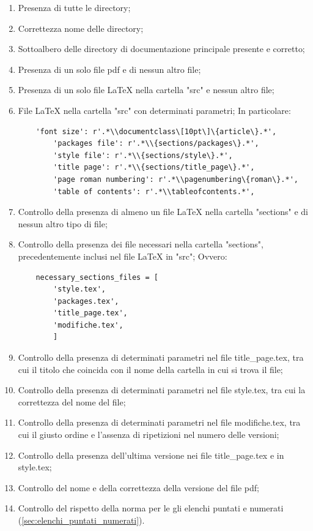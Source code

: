 \begin{enumerate}
	\item Presenza di tutte le directory;
	\item Correttezza nome delle directory;
	\item Sottoalbero delle directory di documentazione principale presente e corretto;
	\item Presenza di un solo file pdf e di nessun altro file;
	\item Presenza di un solo file LaTeX nella cartella "src" e nessun altro file;
	\item File LaTeX nella cartella "src" con determinati parametri;
	\newline In particolare:
	\begin{lstlisting}
	'font size': r'.*\\documentclass\[10pt\]\{article\}.*',
        'packages file': r'.*\\{sections/packages\}.*',
        'style file': r'.*\\{sections/style\}.*',
        'title page': r'.*\\{sections/title_page\}.*',
        'page roman numbering': r'.*\\pagenumbering\{roman\}.*',
        'table of contents': r'.*\\tableofcontents.*',
	\end{lstlisting}
	\item Controllo della presenza di almeno un file LaTeX nella cartella "sections" e di nessun altro tipo di file;
	\item Controllo della presenza dei file necessari nella cartella "sections", precedentemente inclusi nel file LaTeX in "src";
	Ovvero:
	\begin{lstlisting}
	necessary_sections_files = [
        'style.tex',
        'packages.tex',
        'title_page.tex',
        'modifiche.tex',
    	]
	\end{lstlisting}
	\item Controllo della presenza di determinati parametri nel file title\_page.tex, tra cui il titolo che coincida con il nome della cartella in cui si trova il file;
	\item Controllo della presenza di determinati parametri nel file style.tex, tra cui la correttezza del nome del file;
	\item Controllo della presenza di determinati parametri nel file modifiche.tex, tra cui il giusto ordine e l'assenza di ripetizioni nel numero delle versioni;
	\item Controllo della presenza dell'ultima versione nei file title\_page.tex e in style.tex;
	\item Controllo del nome e della correttezza della versione del file pdf;
	\item Controllo del rispetto della norma per le gli elenchi puntati e numerati (\ref{sec:elenchi_puntati_numerati}).
\end{enumerate}

